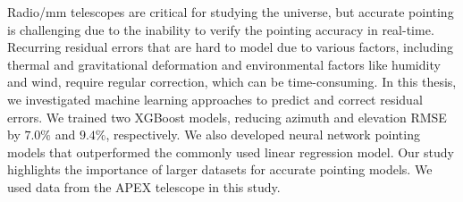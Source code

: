 
Radio/mm telescopes are critical for studying the universe, but accurate pointing is challenging due to the inability to verify the pointing accuracy in real-time.
Recurring residual errors that are hard to model due to various factors, including thermal and gravitational deformation and environmental factors like humidity and wind, require regular correction, which can be time-consuming.
In this thesis, we investigated machine learning approaches to predict and correct residual errors.
We trained two XGBoost models, reducing azimuth and elevation RMSE by $7.0\%$ and $9.4\%$, respectively.
We also developed neural network pointing models that outperformed the commonly used linear regression model.
Our study highlights the importance of larger datasets for accurate pointing models.
We used data from the APEX telescope in this study.



